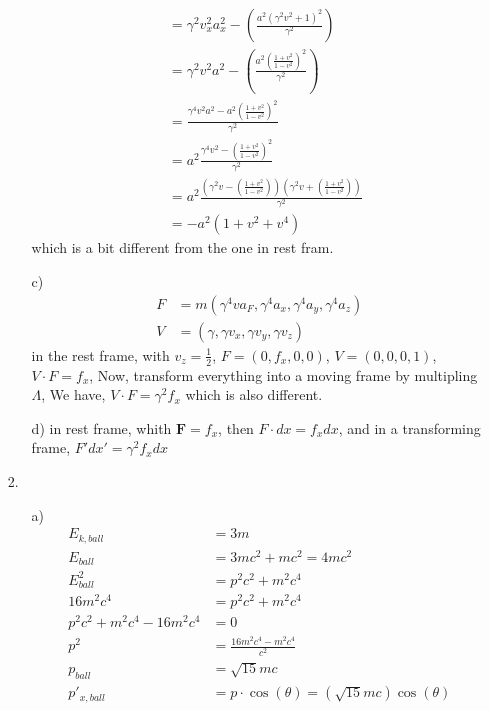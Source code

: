 \documentclass{article}
\begin{document}
\begin{itemize}
\begin{itemize}
\begin{align*}
            &=\gamma^2v_x^2a_x^2-\left(\frac{a^2(\gamma^2v^2+1)^2}{\gamma^2}\right)\\
            &=\gamma^2v^2a^2-\left(\frac{a^2\left(\frac{1+v^2}{1-v^2}\right)^2}{\gamma^2}\right)\\
            &=\frac{\gamma^4v^2a^2-a^2\left(\frac{1+v^2}{1-v^2}\right)^2}{\gamma^2}\\
            &=a^2\frac{\gamma^4v^2-\left(\frac{1+v^2}{1-v^2}\right)^2}{\gamma^2}\\
            &=a^2\frac{\left(\gamma^2v-\left(\frac{1+v^2}{1-v^2}\right)\right)\left(\gamma^2v+\left(\frac{1+v^2}{1-v^2}\right)\right)}{\gamma^2}\\
            &=-a^2(1+v^2+v^4)
        \end{align*}
        which is a bit different from the one in rest fram.
        \item [c)]
        \begin{align*}
            F&=m\left(\gamma^4va_F,\gamma^4a_x,\gamma^4a_y,\gamma^4a_z\right)\\
            V&=\left(\gamma,\gamma v_x,\gamma v_y, \gamma v_z\right)
        \end{align*}
        in the rest frame, with \(v_z=\frac{1}{2}\), \(F=(0,f_x,0,0)\), \(V=(0,0,0,1)\), \(V\cdot F=f_x\), Now, transform everything into a moving frame by multipling \(\Lambda \), We have,
        \(V\cdot F=\gamma^2f_x\) which is also different.
        \item [d)] in rest frame, whith \(\mathbf{F}=f_x\), then \(F\cdot dx=f_xdx\), and in a transforming frame, \(F'dx'=\gamma^2f_xdx\)
    \end{itemize}
    \item [2.]
    \begin{itemize}
        \item [a)]
        \begin{align*}
            E_{k,ball}&=3m\\
            E_{ball}&=3mc^2+mc^2=4mc^2\\
            E_{ball}^2&=p^2c^2+m^2c^4\\
            16m^2c^4 &=p^2c^2+m^2c^4\\
            p^2c^2+m^2c^4-16m^2c^4&=0\\
            p^2&=\frac{16m^2c^4-m^2c^4}{c^2}\\
            p_{ball}&=\sqrt{15}mc\\
            p'_{x,ball}&=p\cdot\cos(\theta)=\left(\sqrt{15}mc\right)\cos(\theta)\\

\end{align*}
\end{itemize}
\end{itemize}
\end{document}
